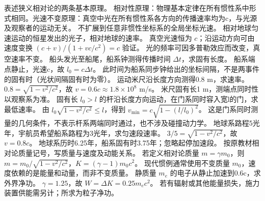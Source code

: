 \problemtext 表述狭义相对论的两条基本原理。
\workings 相对性原理：物理基本定律在所有惯性系中形式相同。光速不变原理：真空中光在所有惯性系各方向的传播速率均为c，与光源及观察者的运动无关。
\crosscheck 不扩展到任意非惯性坐标系的全局坐标光速。
\problemtext 相对地球匀速运动的恒星发出的光子，相对地球的速率。
\workings 真空光速恒为 $c$；沿运动方向可由速度变换 $(c+v)/(1+vc/c^2)=c$ 验证。
\crosscheck 光的频率可因多普勒效应而改变，真空速率不变。
\problemtext 船头发光至船尾，船系钟测得传播时间 $\Delta t$，求固有长度。
\workings 船系端点静止，光速c，故 $l_0=c\Delta t$。
\crosscheck 此时间为船系同步钟给出的坐标间隔，不是两事件的固有时（光状间隔固有时为零）。
\problemtext 运动米尺沿长度方向测得0.8 m，求速率。
\workings $0.8=\sqrt{1-v^2/c^2}$，故 $v=0.6c\approx1.8\times10^8$ m/s。
\crosscheck 米尺固有长1 m，测端点同时性以观察系为准。
\problemtext 固有长 $l_0>l$ 的杆沿长度方向运动，在门系同时容入宽l的门，求最低速率。
\workings 由 $l_0\sqrt{1-v^2/c^2}\le l$，得到 $v_{\min}=c\sqrt{1-(l/l_0)^2}$。
\crosscheck 这是门系同时测量的几何条件，不表示杆系两端同时通过，也不涉及碰撞动力学。
\problemtext 地球系路程5光年，宇航员希望船系路程为3光年，求匀速段速率。
\workings $3/5=\sqrt{1-v^2/c^2}$，故 $v=0.8c$。
\crosscheck 地球系历时6.25年，船系固有时3.75年；忽略起停加速段。
\problemtext 按原教材相对论质量记号，写质量与速度及动能关系。
\workings 若定义相对论质量 $m=\gamma m_0$，则 $m=m_0/\sqrt{1-v^2/c^2}$，$K=(\gamma-1)m_0c^2$。
\crosscheck 现代惯例通常使用不变质量 $m_0$，速度依赖的是能量和动量，而非不变质量。
\problemtext 静质量 $m_e$ 的电子从静止加速到0.6c，求外界净功。
\workings $\gamma=1.25$，故 $W=\Delta K=0.25m_ec^2$。
\crosscheck 若有辐射或其他能量损失，施力装置供能需另计；所求为粒子净功。

